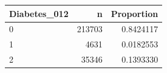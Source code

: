 
\begin{tabular}{lrr}
\toprule
Diabetes\_012 & n & Proportion\\
\midrule
0 & 213703 & 0.8424117\\
1 & 4631 & 0.0182553\\
2 & 35346 & 0.1393330\\
\bottomrule
\end{tabular}
